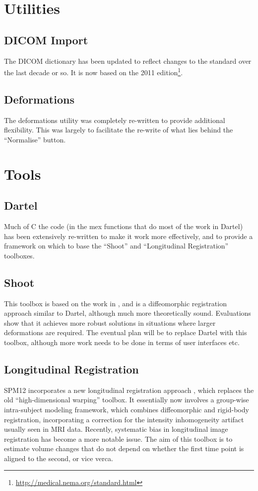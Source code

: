 \documentclass[a4paper,titlepage,openany]{article}
\begin{document}
\begin{multicols}{2}
\section{Utilities}

\subsection{DICOM Import}
The DICOM dictionary has been updated to reflect changes to the standard over the last decade or so.
It is now based on the 2011 edition\footnote{\url{http://medical.nema.org/standard.html}}.

\subsection{Deformations}
The deformations utility was completely re-written to provide additional flexibility.
This was largely to facilitate the re-write of what lies behind the ``Normalise'' button.

\section{Tools}

\subsection{Dartel}
Much of C the code (in the mex functions that do most of the work in Dartel) has been extensively re-written to make it work more effectively, and to provide a framework on which to base the ``Shoot'' and ``Longitudinal Registration'' toolboxes.

\subsection{Shoot}
This toolbox is based on the work in \cite{ashburner2011diffeomorphic}, and is a diffeomorphic registration approach similar to Dartel, although much more theoretically sound.
Evaluations show that it achieves more robust solutions in situations where larger deformations are required.
The eventual plan will be to replace Dartel with this toolbox, although more work needs to be done in terms of user interfaces etc.

\subsection{Longitudinal Registration}
SPM12 incorporates a new longitudinal registration approach \cite{ashburner2013symmetric}, which replaces the old ``high-dimensional warping'' toolbox.
It essentially now involves a group-wise intra-subject modeling framework, which combines diffeomorphic \cite{ashburner2011diffeomorphic} and rigid-body registration, incorporating a correction for the intensity inhomogeneity artifact usually seen in MRI data.
Recently, systematic bias in longitudinal image registration has become a more notable issue.
The aim of this toolbox is to estimate volume changes that do not depend on whether the first time point is aligned to the second, or vice verca. 


\end{multicols}
\end{document}
